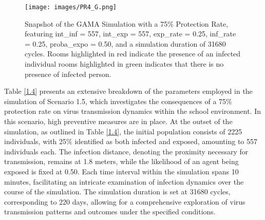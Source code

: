  	\begin{figure}[H]
	\centering
	\texttt{[image: images/PR4\_G.png]}
	\caption{Snapshot of the GAMA Simulation with a 75\% Protection Rate, featuring int\_inf = 557, int\_exp = 557, exp\_rate = 0.25, inf\_rate = 0.25, proba\_expo = 0.50, and a simulation duration of 31680 cycles. Rooms highlighted in red indicate the presence of an infected individual rooms highlighted in green indicates that there is no presence of infected person.}
	\label{PR4G}
\end{figure}

Table \ref{1.4} presents an extensive breakdown of the parameters employed in the simulation of Scenario 1.5, which investigates the consequences of a 75\% protection rate on virus transmission dynamics within the school environment. In this scenario, high preventive measures are in place. At the outset of the simulation, as outlined in Table \ref{1.4}, the initial population consists of 2225 individuals, with 25\% identified as both infected and exposed, amounting to 557 individuals each. The infection distance, denoting the proximity necessary for transmission, remains at 1.8 meters, while the likelihood of an agent being exposed is fixed at 0.50. Each time interval within the simulation spans 10 minutes, facilitating an intricate examination of infection dynamics over the course of the simulation. The simulation duration is set at 31680 cycles, corresponding to 220 days, allowing for a comprehensive exploration of virus transmission patterns and outcomes under the specified conditions.

